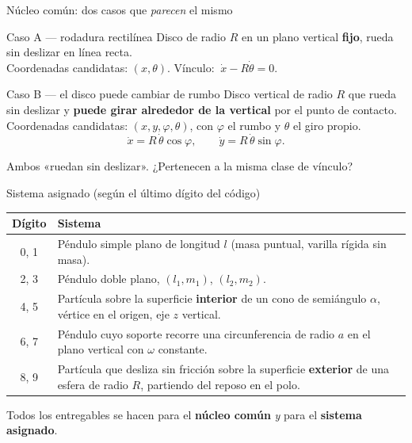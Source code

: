 \documentclass[10pt,aspectratio=169]{beamer}
\begin{document}
\begin{frame}{Núcleo común: dos casos que \emph{parecen} el mismo}
  \begin{block}{Caso A --- rodadura rectilínea}
    Disco de radio $R$ en un plano vertical \textbf{fijo}, rueda sin deslizar en línea recta.\\
    Coordenadas candidatas: $(x,\theta)$. \qquad Vínculo: $\ \dot x - R\dot\theta = 0$.
  \end{block}
  \pause
  \begin{block}{Caso B --- el disco puede cambiar de rumbo}
    Disco vertical de radio $R$ que rueda sin deslizar y \textbf{puede girar alrededor de la vertical} por el punto de contacto.\\
    Coordenadas candidatas: $(x,y,\varphi,\theta)$, con $\varphi$ el rumbo y $\theta$ el giro propio.
    \[
      \dot x = R\,\dot\theta\cos\varphi, \qquad \dot y = R\,\dot\theta\sin\varphi .
    \]
  \end{block}
  \pause
  \begin{center}
    \alert{Ambos «ruedan sin deslizar». ¿Pertenecen a la misma clase de vínculo?}
  \end{center}
\end{frame}

\begin{frame}{Sistema asignado (según el último dígito del código)}
  \small
  \begin{table}
  \begin{tabular}{@{}cp{11.5cm}@{}}
    \toprule
    \textbf{Dígito} & \textbf{Sistema} \\
    \midrule
    0, 1 & Péndulo simple plano de longitud $l$ (masa puntual, varilla rígida sin masa). \\
    2, 3 & Péndulo doble plano, $(l_1,m_1)$, $(l_2,m_2)$. \\
    4, 5 & Partícula sobre la superficie \textbf{interior} de un cono de semiángulo $\alpha$, vértice en el origen, eje $z$ vertical. \\
    6, 7 & Péndulo cuyo soporte recorre una circunferencia de radio $a$ en el plano vertical con $\omega$ constante. \\
    8, 9 & Partícula que desliza sin fricción sobre la superficie \textbf{exterior} de una esfera de radio $R$, partiendo del reposo en el polo. \\
    \bottomrule
  \end{tabular}
  \end{table}
  Todos los entregables se hacen para el \textbf{núcleo común} \emph{y} para el \textbf{sistema asignado}.
\end{frame}
\end{document}

